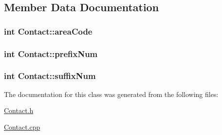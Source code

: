 \subsection{Member Data Documentation}
\hypertarget{classContact_a9982efa21fdf3aa80ecb27fca50c1112}{
\subsubsection[{area\+Code}]{\setlength{\rightskip}{0pt plus 5cm}int Contact\+::area\+Code\hspace{0.3cm}{\ttfamily [private]}}}\label{classContact_a9982efa21fdf3aa80ecb27fca50c1112}
\hypertarget{classContact_af88818b83e23babeeaccadbd957c5b3a}{
\subsubsection[{prefix\+Num}]{\setlength{\rightskip}{0pt plus 5cm}int Contact\+::prefix\+Num\hspace{0.3cm}{\ttfamily [private]}}}\label{classContact_af88818b83e23babeeaccadbd957c5b3a}
\hypertarget{classContact_a741fc49c27f513429795c99b07bceae1}{
\subsubsection[{suffix\+Num}]{\setlength{\rightskip}{0pt plus 5cm}int Contact\+::suffix\+Num\hspace{0.3cm}{\ttfamily [private]}}}\label{classContact_a741fc49c27f513429795c99b07bceae1}


The documentation for this class was generated from the following files\+:\begin{DoxyCompactItemize}
\item 
\hyperlink{Contact_8h}{Contact.\+h}\item 
\hyperlink{Contact_8cpp}{Contact.\+cpp}\end{DoxyCompactItemize}
